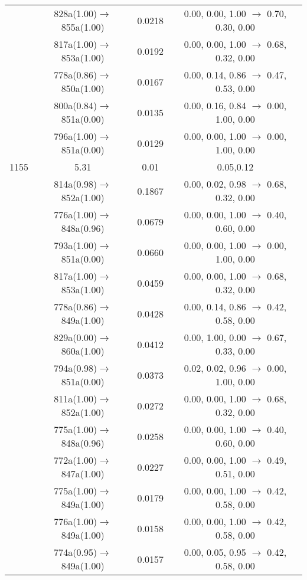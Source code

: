 \documentclass[10pt,a4paper]{article}
\begin{document}
\begin{longtable}{c|c|c|c}
 	& 828a(1.00)$\rightarrow$855a(1.00) &	 0.0218 &	 0.00, 0.00, 1.00 $\rightarrow$ 0.70, 0.30, 0.00 \\ 
 	& 817a(1.00)$\rightarrow$853a(1.00) &	 0.0192 &	 0.00, 0.00, 1.00 $\rightarrow$ 0.68, 0.32, 0.00 \\ 
 	& 778a(0.86)$\rightarrow$850a(1.00) &	 0.0167 &	 0.00, 0.14, 0.86 $\rightarrow$ 0.47, 0.53, 0.00 \\ 
 	& 800a(0.84)$\rightarrow$851a(0.00) &	 0.0135 &	 0.00, 0.16, 0.84 $\rightarrow$ 0.00, 1.00, 0.00 \\ 
 	& 796a(1.00)$\rightarrow$851a(0.00) &	 0.0129 &	 0.00, 0.00, 1.00 $\rightarrow$ 0.00, 1.00, 0.00 \\ 
 \hline1155 &	 5.31 &	 0.01 &	 0.05,0.12 \\ 
  	& 814a(0.98)$\rightarrow$852a(1.00) &	 0.1867 &	 0.00, 0.02, 0.98 $\rightarrow$ 0.68, 0.32, 0.00 \\ 
 	& 776a(1.00)$\rightarrow$848a(0.96) &	 0.0679 &	 0.00, 0.00, 1.00 $\rightarrow$ 0.40, 0.60, 0.00 \\ 
 	& 793a(1.00)$\rightarrow$851a(0.00) &	 0.0660 &	 0.00, 0.00, 1.00 $\rightarrow$ 0.00, 1.00, 0.00 \\ 
 	& 817a(1.00)$\rightarrow$853a(1.00) &	 0.0459 &	 0.00, 0.00, 1.00 $\rightarrow$ 0.68, 0.32, 0.00 \\ 
 	& 778a(0.86)$\rightarrow$849a(1.00) &	 0.0428 &	 0.00, 0.14, 0.86 $\rightarrow$ 0.42, 0.58, 0.00 \\ 
 	& 829a(0.00)$\rightarrow$860a(1.00) &	 0.0412 &	 0.00, 1.00, 0.00 $\rightarrow$ 0.67, 0.33, 0.00 \\ 
 	& 794a(0.98)$\rightarrow$851a(0.00) &	 0.0373 &	 0.02, 0.02, 0.96 $\rightarrow$ 0.00, 1.00, 0.00 \\ 
 	& 811a(1.00)$\rightarrow$852a(1.00) &	 0.0272 &	 0.00, 0.00, 1.00 $\rightarrow$ 0.68, 0.32, 0.00 \\ 
 	& 775a(1.00)$\rightarrow$848a(0.96) &	 0.0258 &	 0.00, 0.00, 1.00 $\rightarrow$ 0.40, 0.60, 0.00 \\ 
 	& 772a(1.00)$\rightarrow$847a(1.00) &	 0.0227 &	 0.00, 0.00, 1.00 $\rightarrow$ 0.49, 0.51, 0.00 \\ 
 	& 775a(1.00)$\rightarrow$849a(1.00) &	 0.0179 &	 0.00, 0.00, 1.00 $\rightarrow$ 0.42, 0.58, 0.00 \\ 
 	& 776a(1.00)$\rightarrow$849a(1.00) &	 0.0158 &	 0.00, 0.00, 1.00 $\rightarrow$ 0.42, 0.58, 0.00 \\ 
 	& 774a(0.95)$\rightarrow$849a(1.00) &	 0.0157 &	 0.00, 0.05, 0.95 $\rightarrow$ 0.42, 0.58, 0.00 \\ 

\end{longtable}
\end{document}
